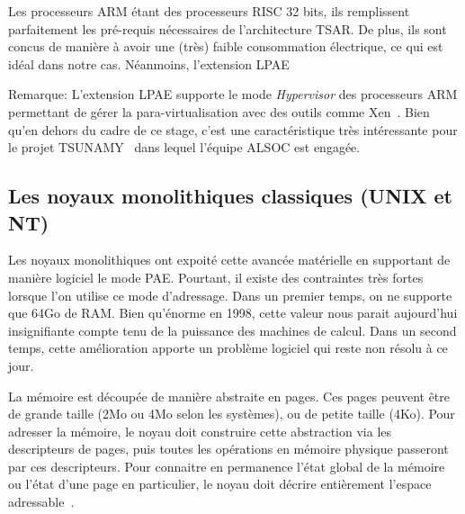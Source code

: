     Les processeurs ARM étant des processeurs RISC 32 bits, ils remplissent
    parfaitement les pré-requis nécessaires de l'architecture TSAR. De plus, ils
    sont concus de manière à avoir une (très) faible consommation électrique, ce
    qui est idéal dans notre cas. Néanmoins, l'extension LPAE

    \begin{paragraph}{Remarque:}
      L'extension LPAE supporte le mode \textit{Hypervisor} des processeurs ARM
      permettant de gérer la para-virtualisation avec des outils comme
      Xen~\cite{barham2003xen}. Bien qu'en dehors du cadre de ce stage, c'est
      une caractéristique très intéressante pour le projet
      TSUNAMY~\cite{tsunamy2013web} dans lequel l'équipe ALSOC est engagée.
    \end{paragraph}


    \subsection{Les noyaux monolithiques classiques (UNIX et NT)}

      Les noyaux monolithiques ont expoité cette avancée matérielle en
      supportant de manière logiciel le mode PAE. Pourtant, il existe des
      contraintes très fortes lorsque l'on utilise ce mode d'adressage. Dans un
      premier temps, on ne supporte que 64Go de RAM. Bien qu'énorme en 1998,
      cette valeur nous parait aujourd'hui insignifiante compte tenu de la
      puissance des machines de calcul.  Dans un second temps, cette
      amélioration apporte un problème logiciel qui reste non résolu à ce
      jour.\newline

      La mémoire est découpée de manière abstraite en pages. Ces pages peuvent
      être de grande taille (2Mo ou 4Mo selon les systèmes), ou de petite taille
      (4Ko). Pour adresser la mémoire, le noyau doit construire cette
      abstraction via les descripteurs de pages, puis toutes les opérations en
      mémoire physique passeront par ces descripteurs. Pour connaitre en
      permanence l'état global de la mémoire ou l'état d'une page en
      particulier, le noyau doit décrire entièrement l'espace
      adressable~\citep{cranor1999uvm, gorman2004understanding,
        russinovich2012windows, dillon2000design, steldt2009memory,
        steldtXXXXopenbsd}.

